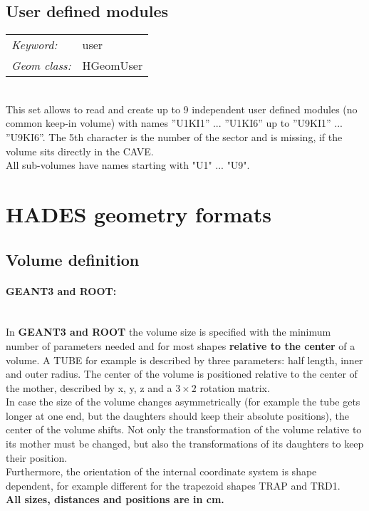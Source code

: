 \subsection*{User defined modules}

\begin{tabular}{ll}
\emph{Keyword:}             & user \\
\emph{Geom class:}          & HGeomUser \\
\end{tabular}\\

This set allows to read and create up to 9 independent user defined modules (no common keep-in volume) with names
''U1KI1'' ... ''U1KI6'' up to  ''U9KI1'' ... ''U9KI6''. The 5th character is the number of the sector and is missing, 
if the volume sits directly in the CAVE.\\
All sub-volumes have names starting with "U1" ... "U9".


\section[HADES geometry formats]{HADES geometry formats} 

\subsection[Volume definition]{Volume definition} \label{sec:geomvolumeformat}

\paragraph{GEANT3 and ROOT:} ~\\
In \textbf{GEANT3 and ROOT} the volume size is specified with the minimum number of parameters needed and for most shapes 
\textbf{relative to the center} of a volume. A TUBE for example is described by three parameters: half length, inner and 
outer radius. The center of the volume is positioned relative to the center of the mother, described by x, y, z and a  
$3\times2$ rotation matrix.\\
In case the size of the volume changes asymmetrically (for example the tube gets longer at one end, but the daughters should 
keep their absolute positions), the center of the volume shifts. Not only the transformation of the volume relative to its 
mother must be changed, but also the transformations of its daughters to keep their position.\\
Furthermore, the orientation of the internal coordinate system is shape dependent, for example different for the trapezoid 
shapes TRAP and TRD1.\\
\textbf{All sizes, distances and positions are in cm.}

